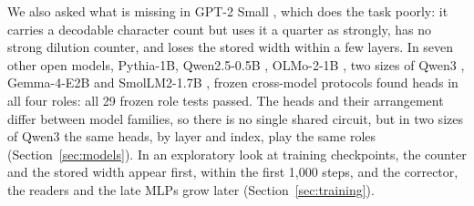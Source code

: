 \documentclass[11pt,a4paper]{article}
\begin{document}
We also asked what is missing in GPT-2 Small \citep{radford2019language}, which does the task poorly: it carries a decodable character count but uses it a quarter as strongly, has no strong dilution counter, and loses the stored width within a few layers. In seven other open models, Pythia-1B, Qwen2.5-0.5B \citep{qwen2024qwen25}, OLMo-2-1B \citep{olmo2024olmo2}, two sizes of Qwen3 \citep{qwen2025qwen3}, Gemma-4-E2B \citep{gemma2026gemma4} and SmolLM2-1.7B \citep{benallal2025smollm2}, frozen cross-model protocols found heads in all four roles: all 29 frozen role tests passed. The heads and their arrangement differ between model families, so there is no single shared circuit, but in two sizes of Qwen3 the same heads, by layer and index, play the same roles (Section~\ref{sec:models}). In an exploratory look at training checkpoints, the counter and the stored width appear first, within the first 1,000 steps, and the corrector, the readers and the late MLPs grow later (Section~\ref{sec:training}).
\end{document}
